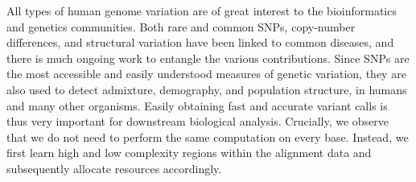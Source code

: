 \documentclass[10pt]{article}
\newcommand\TODO[1]{\textcolor{red}{TODO: #1}}
\begin{document}
All types of human genome variation are of great interest to the bioinformatics
and genetics communities.  Both rare and common SNPs, copy-number differences,
and structural variation have been linked to common diseases, and there is much
ongoing work to entangle the various contributions.  Since SNPs are the most
accessible and easily understood measures of genetic variation, they are also
used to detect admixture, demography, and population structure, in humans and
many other organisms.  Easily obtaining fast and accurate variant calls is thus
very important for downstream biological analysis.
Crucially, we observe that we do not need to perform the same computation on
every base.  Instead, we first learn high and low complexity regions within the
alignment data and subsequently allocate resources accordingly.





\end{document}
